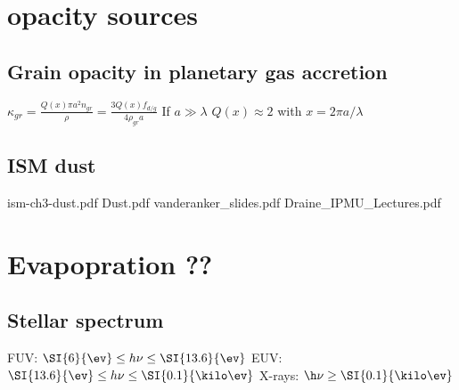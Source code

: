 \chapter{opacity sources}

\section{Grain opacity in planetary gas accretion}
$\kappa_{gr}=\frac{Q(x)\pi a^2n_{gr}}{\rho}=\frac{3Q(x)f_{d/g}}{4\rho_{gr}a}$
If $a\gg\lambda$ $Q(x)\approx2$ with $x=2\pi a/\lambda$

\section{ISM dust}
ism-ch3-dust.pdf
Dust.pdf
vanderanker_slides.pdf
Draine_IPMU_Lectures.pdf
\chapter{Evapopration ??}

\section{Stellar spectrum}

FUV: $\SI{6}{\ev}\leq h\nu\leq\SI{13.6}{\ev}$
EUV: $\SI{13.6}{\ev}\leq h\nu\leq\SI{0.1}{\kilo\ev}$
X-rays: $\h\nu\geq\SI{0.1}{\kilo\ev}$